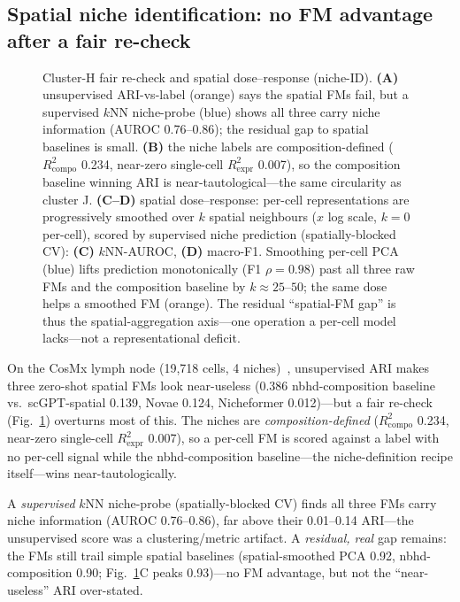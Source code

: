 \documentclass[journal]{IEEEtran}
\begin{document}
\subsection{Spatial niche identification: no FM advantage after a fair re-check}
\begin{figure}[!tbp]\centering
\resizebox{\textwidth}{!}{}
\caption{Cluster-H fair re-check and spatial dose--response (niche-ID). \textbf{(A)} unsupervised ARI-vs-label (orange) says the spatial FMs fail, but a supervised $k$NN niche-probe (blue) shows all three carry niche information (AUROC 0.76--0.86); the residual gap to spatial baselines is small. \textbf{(B)} the niche labels are composition-defined ($R^2_{\mathrm{compo}}$ 0.234, near-zero single-cell $R^2_{\mathrm{expr}}$ 0.007), so the composition baseline winning ARI is near-tautological---the same circularity as cluster J. \textbf{(C--D)} spatial dose--response: per-cell representations are progressively smoothed over $k$ spatial neighbours ($x$ log scale, $k{=}0$ per-cell), scored by supervised niche prediction (spatially-blocked CV): \textbf{(C)} $k$NN-AUROC, \textbf{(D)} macro-F1. Smoothing per-cell PCA (blue) lifts prediction monotonically (F1 $\rho=0.98$) past all three raw FMs and the composition baseline by $k\approx25$--$50$; the same dose helps a smoothed FM (orange). The residual ``spatial-FM gap'' is thus the spatial-aggregation axis---one operation a per-cell model lacks---not a representational deficit.}\label{fig:spfair}\end{figure}
On the CosMx lymph node (19{,}718 cells, 4 niches)~\cite{wang2026niche}, unsupervised ARI makes three zero-shot spatial FMs look near-useless (0.386 nbhd-composition baseline vs.\ scGPT-spatial 0.139, Novae 0.124, Nicheformer 0.012)---but a fair re-check (Fig.~\ref{fig:spfair}) overturns most of this. The niches are \emph{composition-defined} ($R^2_{\mathrm{compo}}$ 0.234, near-zero single-cell $R^2_{\mathrm{expr}}$ 0.007), so a per-cell FM is scored against a label with no per-cell signal while the nbhd-composition baseline---the niche-definition recipe itself---wins near-tautologically.

A \emph{supervised} $k$NN niche-probe (spatially-blocked CV) finds all three FMs carry niche information (AUROC 0.76--0.86), far above their 0.01--0.14 ARI---the unsupervised score was a clustering/metric artifact. A \emph{residual, real} gap remains: the FMs still trail simple spatial baselines (spatial-smoothed PCA 0.92, nbhd-composition 0.90; Fig.~\ref{fig:spfair}C peaks 0.93)---no FM advantage, but not the ``near-useless'' ARI over-stated.
\end{document}
